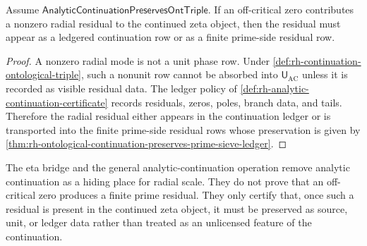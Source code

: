 \begin{theorem}
\label{thm:rh-continuation-cannot-hide-radial-residual}
Assume $\mathsf{AnalyticContinuationPreservesOntTriple}$.  If an
off-critical zero contributes a nonzero radial residual to the
continued zeta object, then the residual must appear as a ledgered
continuation row or as a finite prime-side residual row.
\end{theorem}

\begin{proof}
A nonzero radial mode is not a unit phase row.  Under
\autoref{def:rh-continuation-ontological-triple}, such a nonunit row
cannot be absorbed into $\mathsf U_{\mathrm{AC}}$ unless it is recorded
as visible residual data.  The ledger policy of
\autoref{def:rh-analytic-continuation-certificate} records residuals,
zeros, poles, branch data, and tails.  Therefore the radial residual
either appears in the continuation ledger or is transported into the
finite prime-side residual rows whose preservation is given by
\autoref{thm:rh-ontological-continuation-preserves-prime-sieve-ledger}.
\end{proof}

\begin{principle}
\label{prin:rh-analytic-continuation-ont-triple-audit-boundary}
The eta bridge and the general analytic-continuation operation remove
analytic continuation as a hiding place for radial scale.  They do not
prove that an off-critical zero produces a finite prime residual.  They
only certify that, once such a residual is present in the continued
zeta object, it must be preserved as source, unit, or ledger data rather
than treated as an unlicensed feature of the continuation.
\end{principle}
